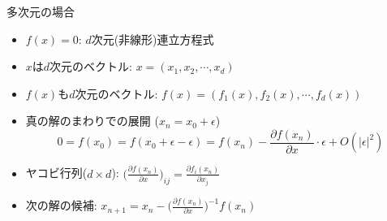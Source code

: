 \begin{frame}[t,fragile]{多次元の場合}
  \begin{itemize}
    \setlength{\itemsep}{1em}
  \item $f(x)=0$: $d$次元(非線形)連立方程式
  \item $x$は$d$次元のベクトル: $x = (x_1,x_2,\cdots,x_d)$
  \item $f(x)$も$d$次元のベクトル: $f(x) = (f_1(x), f_2(x),\cdots,f_d(x))$
  \item 真の解のまわりでの展開 ($x_n = x_0 + \epsilon$)
    \[
    0 = f(x_0) = f(x_0+\epsilon-\epsilon) = f(x_n) - \frac{\partial f(x_n)}{\partial x} \cdot \epsilon + O(|\epsilon|^2)
    \]
  \item ヤコビ行列($d\times d$): $\displaystyle \Big(\frac{\partial f(x_n)}{\partial x}\Big)_{ij} = \frac{\partial f_i(x_n)}{\partial x_j}$
  \item 次の解の候補: $\displaystyle x_{n+1} = x_n - \Big(\frac{\partial f(x_n)}{\partial x}\Big)^{-1} f(x_n)$
  \end{itemize}
\end{frame}
